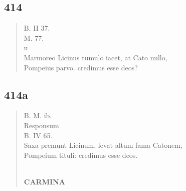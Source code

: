 \documentclass[11pt, a4paper]{report}
\begin{document}
            \subsection*{414}
      \begin{verse}
      B. II 37. \\ M. 77. \\ u \\ Marmoreo Licinus tumulo iacet, at Cato nullo, \\ Pompeius parvo. credimus esse deos? \\ 
      \end{verse}
  
            \subsection*{414a}
      \begin{verse}
      B. M. ib. \\  \lbrack Responsum \rbrack  \\ B. IV 65. \\ Saxa premunt Licinum, levat altum fama Catonem, \\ Pompeium tituli: credimus esse deos. \\ 
        ﻿\pagebreak 
     \marginpar{[320]} \begin{center} \textbf{CARMINA} \end{center}
      \end{verse}
  
\end{document}
